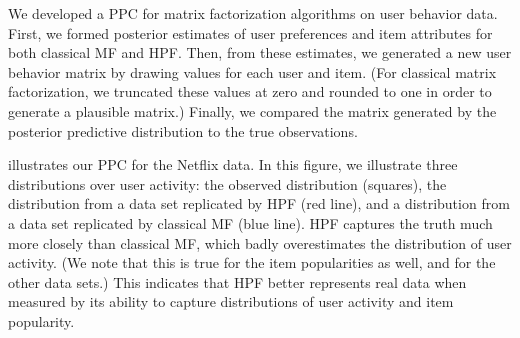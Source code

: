 We developed a PPC for matrix factorization algorithms on user
behavior data.  First, we formed posterior estimates of user
preferences and item attributes for both classical MF and HPF.  Then,
from these estimates, we generated a new user behavior matrix by
drawing values for each user and item.  (For classical matrix
factorization, we truncated these values at zero and rounded to one in
order to generate a plausible matrix.)  Finally, we compared
the matrix generated by the posterior predictive distribution to the
true observations.

 illustrates our PPC for the Netflix data.  In this
figure, we illustrate three distributions over user activity: the
observed distribution (squares), the distribution from a data set
replicated by HPF (red line), and a distribution from a data set
replicated by classical MF (blue line).  HPF captures the truth much
more closely than classical MF, which badly overestimates the
distribution of user activity.  (We note that this is true for the
item popularities as well, and for the other data sets.) This
indicates that HPF better represents real data when measured by its
ability to capture distributions of user activity and item popularity.



